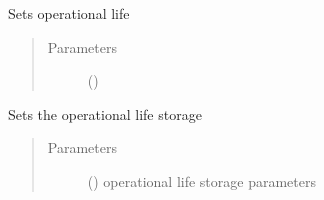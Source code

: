 \documentclass[a4paper,12pt,english]{article}
\begin{document}
\begin{fulllineitems}
\begin{fulllineitems}
\begin{quote}
\begin{description}
\end{description}\end{quote}

\end{fulllineitems}


\begin{fulllineitems}
\label{\detokenize{GOCPI:GOCPI.CreateCases.CreateCases.set_operational_life}}
Sets operational life
\begin{quote}\begin{description}
\item[{Parameters}] \leavevmode
{} () \textendash{} 

\end{description}\end{quote}

\end{fulllineitems}


\begin{fulllineitems}
\label{\detokenize{GOCPI:GOCPI.CreateCases.CreateCases.set_operational_life_storage}}
Sets the operational life storage
\begin{quote}\begin{description}
\item[{Parameters}] \leavevmode
{} (\sphinxstyleliteralemphasis{\sphinxupquote{, }}) \textendash{} operational life storage parameters

\end{description}\end{quote}

\end{fulllineitems}


\end{fulllineitems}
\end{document}
